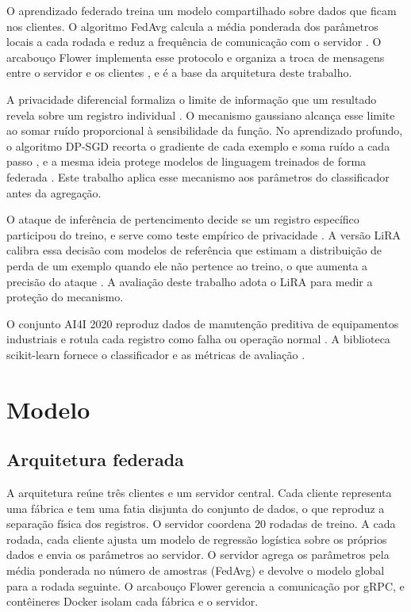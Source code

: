 \documentclass[12pt]{article}
\begin{document}
O aprendizado federado treina um modelo compartilhado sobre dados que ficam nos
clientes. O algoritmo FedAvg calcula a média ponderada dos parâmetros locais a cada
rodada e reduz a frequência de comunicação com o servidor \cite{mcmahan2017fedavg}.
O arcabouço Flower implementa esse protocolo e organiza a troca de mensagens entre o
servidor e os clientes \cite{beutel2020flower}, e é a base da arquitetura deste
trabalho.

A privacidade diferencial formaliza o limite de informação que um resultado revela
sobre um registro individual \cite{dwork2014foundations}. O mecanismo gaussiano
alcança esse limite ao somar ruído proporcional à sensibilidade da função. No
aprendizado profundo, o algoritmo DP-SGD recorta o gradiente de cada exemplo e soma
ruído a cada passo \cite{abadi2016deep}, e a mesma ideia protege modelos de
linguagem treinados de forma federada \cite{mcmahan2018learning}. Este trabalho
aplica esse mecanismo aos parâmetros do classificador antes da agregação.

O ataque de inferência de pertencimento decide se um registro específico participou
do treino, e serve como teste empírico de privacidade \cite{shokri2017membership}. A
versão LiRA calibra essa decisão com modelos de referência que estimam a
distribuição de perda de um exemplo quando ele não pertence ao treino, o que aumenta a
precisão do ataque \cite{carlini2022membership}. A avaliação deste trabalho adota o
LiRA para medir a proteção do mecanismo.

O conjunto AI4I 2020 reproduz dados de manutenção preditiva de equipamentos
industriais e rotula cada registro como falha ou operação normal
\cite{matzka2020explainable}. A biblioteca scikit-learn fornece o classificador e as
métricas de avaliação \cite{pedregosa2011scikit}.

\section{Modelo} \label{sec:model}

\subsection{Arquitetura federada}

A arquitetura reúne três clientes e um servidor central. Cada cliente representa uma
fábrica e tem uma fatia disjunta do conjunto de dados, o que reproduz a separação
física dos registros. O servidor coordena 20 rodadas de treino. A cada rodada, cada
cliente ajusta um modelo de regressão logística sobre os próprios dados e envia os
parâmetros ao servidor. O servidor agrega os parâmetros pela média ponderada no
número de amostras (FedAvg) e devolve o modelo global para a rodada seguinte. O
arcabouço Flower gerencia a comunicação por gRPC, e contêineres Docker isolam cada
fábrica e o servidor.
\end{document}
